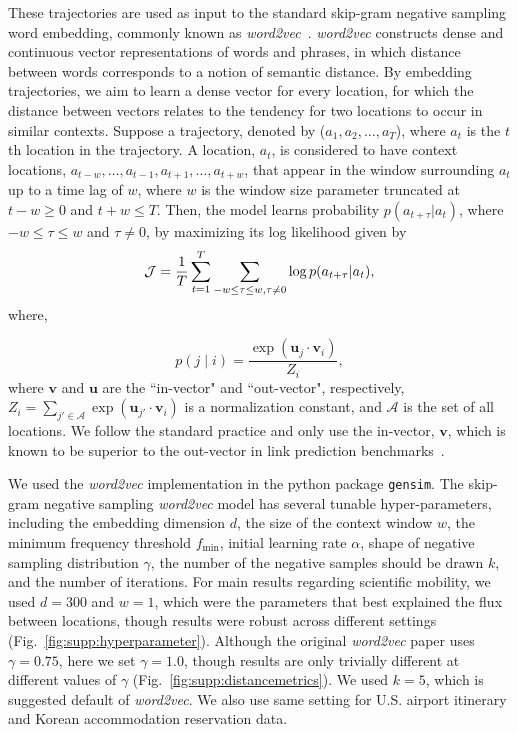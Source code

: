 \documentclass[12pt]{article} %
\def\given{\mid}
\begin{document}
These trajectories are used as input to the standard skip-gram negative sampling word embedding, commonly known as \textit{word2vec}~\autocite{mikolov2013word2vec}.
\textit{word2vec} constructs dense and continuous vector representations of words and phrases, in which distance between words corresponds to a notion of semantic distance.
By embedding trajectories, we aim to learn a dense vector for every location, for which the distance between vectors relates to the tendency for two locations to occur in similar contexts.
Suppose a trajectory, denoted by ($a_{1}, a_{2}, \ldots, a_{T}$), where $a_{t}$ is the $t$th location in the trajectory. A location, $a_{t}$, is considered to have context locations, $a_{t-w}, \ldots, a_{t-1}, a_{t+1},\ldots, a_{t+w}$, that appear in the window surrounding $a_t$ up to a time lag of $w$, where $w$ is the window size parameter truncated at $t - w \geq 0$ and $t + w \leq T$. Then, the model learns probability $p(a_{t + \tau} \vert a_{t})$, where $-w\leq \tau\leq w$ and $\tau \neq 0$,  by maximizing its log likelihood given by
%
%
\begin{equation}
	{\cal J} = \frac{1}{T}\sum_{t = 1}^{T} \sum_{-w \leq \tau \leq w, \tau \neq 0} \log p(a_{t + \tau} \vert a_{t}),
\end{equation}
where,

%
%
\begin{equation}
	p(j \given i) = \frac{\exp(\bm{u}_j \cdot \bm{v}_{i})}{Z_i}, \label{eq:cond_prob_w2v}
\end{equation}
where $\bm{v}$ and $\bm{u}$ are the ``in-vector" and ``out-vector", respectively,  $Z_i=\sum_{j' \in \mathcal{A}} \exp(\bm{u}_{j'} \cdot \bm{v}_{i})$ is a normalization constant, and $\mathcal{A}$ is the set of all locations.
We follow the standard practice and only use the in-vector, $\bm{v}$,  which is known to be superior to the out-vector in link prediction benchmarks~\autocite{linzhuo2020hyperbolic, tshitoyan2019mat2vec, garg2018gender, kozlowski2018geometry, hamilton2016diachronic, le2014doc2vec, nakandala2017gendered}.


We used the \textit{word2vec}  implementation in the python package \texttt{gensim}.
The skip-gram negative sampling  \textit{word2vec} model has several tunable hyper-parameters, including the embedding dimension $d$, the size of the context window $w$, the minimum frequency threshold $f_{\min}$, initial learning rate $\alpha$, shape of negative sampling distribution $\gamma$, the number of the negative samples should be drawn $k$, and the number of iterations.
For main results regarding scientific mobility, we used $d=300$ and $w=1$, which were the parameters that best explained the flux between locations, though results were robust across different settings (Fig.~\ref{fig:supp:hyperparameter}).
Although the original \textit{word2vec } paper uses $\gamma = 0.75$\autocite{mikolov2013word2vec}, here we set $\gamma = 1.0$, though results are only trivially different at different values of $\gamma$ (Fig.~\ref{fig:supp:distancemetrics}). We used $k=5$, which is suggested default of \textit{word2vec}.
We also use same setting for U.S. airport itinerary and Korean accommodation reservation data.
\end{document}

